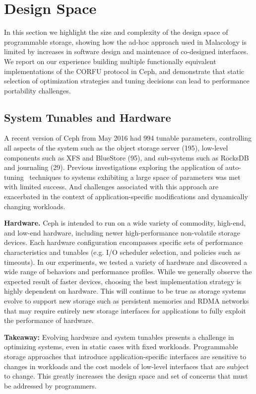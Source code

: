 \section{Design Space}
\label{sec:dspace}

In this section we highlight the size and complexity of the design space of
programmable storage, showing how the ad-hoc approach used in Malacology is
limited by increases in software design and maintenace of co-designed
interfaces. We report on our experience building multiple functionally
equivalent implementations of the CORFU protocol in Ceph, and demonstrate that
static selection of optimization strategies and tuning decisions can lead to
performance portability challenges.

\subsection{System Tunables and Hardware}

A recent version of Ceph from May 2016 had 994 tunable parameters, controlling
all aspects of the system such as the object storage server (195), low-level
components such as XFS and BlueStore (95), and sub-systems such as RocksDB
and journaling (29). Previous investigations exploring the application of
auto-tuning~\cite{behzad:sc2013-autotuning} techniques to systems exhibiting a
large space of parameters was met with limited success. And challenges
associated with this approach are exacerbated in the context of
application-specific modifications and dynamically changing workloads.

{\bf Hardware.} Ceph is intended to run on a wide variety of commodity,
high-end, and low-end hardware, including newer high-performance non-volatile
storage devices. Each hardware configuration encompasses specific sets of
performance characteristics and tunables (e.g. I/O scheduler selection, and
policies such as timeouts). In our experiments, we tested a variety of
hardware and discovered a wide range of behaviors and performance profiles.
While we generally observe the expected result of faster devices, choosing the
best implementation strategy is highly dependent on hardware. This will
continue to be true as storage systems evolve to support new storage such as
persistent memories and RDMA networks that may require entirely new storage
interfaces for applications to fully exploit the performance of hardware.

\textbf{Takeaway:} Evolving hardware and system tunables presents a challenge
in optimizing systems, even in static cases with fixed workloads. Programmable
storage approaches that introduce application-specific interfaces are
sensitive to changes in workloads and the cost models of
low-level interfaces that are subject to change. This greatly increases the design
space and set of concerns that must be addressed by programmers.

